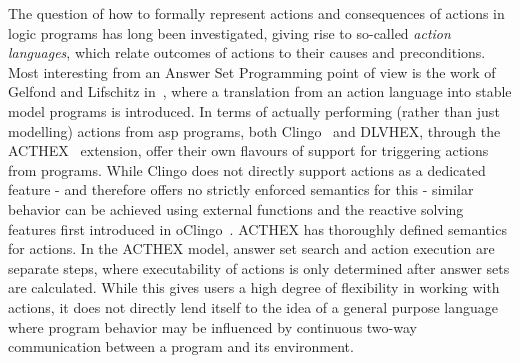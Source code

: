 The question of how to formally represent actions and consequences of actions in logic programs has long been investigated, giving rise to so-called \emph{action languages}, which relate outcomes of actions to their causes and preconditions. Most interesting from an Answer Set Programming  point of view is the work of Gelfond and Lifschitz in~\cite{action-and-change}, where a translation from an action language into stable model programs is introduced. In terms of actually performing (rather than just modelling) actions from \gls{asp} programs, both Clingo~\cite{clingo4} and DLVHEX, through the ACTHEX~\cite{acthex} extension, offer their own flavours of support for triggering actions from programs. While Clingo does not directly support actions as a dedicated feature - and therefore offers no strictly enforced semantics for this - similar behavior can be achieved using external functions and the reactive solving features first introduced in oClingo~\cite{oclingo}. ACTHEX has thoroughly defined semantics for actions. In the ACTHEX model, answer set search and action execution are separate steps, where executability of actions is only determined after answer sets are calculated. While this gives users a high degree of flexibility in working with actions, it does not directly lend itself to the idea of a general purpose language where program behavior may be influenced by continuous two-way communication between a program and its environment.


